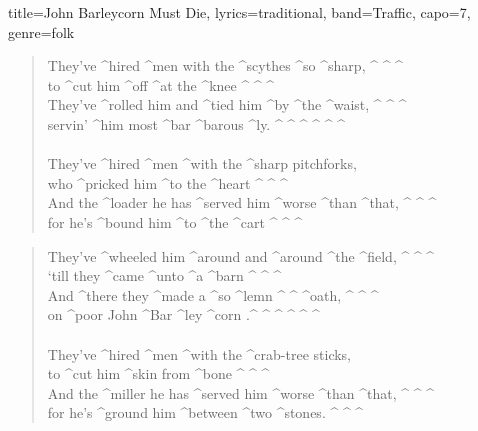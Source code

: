 \documentclass{article}
\def\RemoveSpaces#1{%
  \begingroup
  \spaceskip1sp
  \xspaceskip1sp
  #1%
  \endgroup}
\begin{document}
\begin{song}{title={John Barleycorn Must Die}, lyrics={traditional}, band={Traffic}, capo={7}, genre={folk}}
\begin{verse}
	\end{verse}
	\begin{chorus*}
		       
	\end{chorus*}
	\begin{verse}
		They've ^hired ^men with the ^scythes ^so ^sharp, ^ {} ^ {} ^ {} \\
		to ^cut him ^off ^at the ^knee ^ {} ^ {} ^ {} \\
		They've ^rolled him and ^tied him ^by ^the ^waist, ^ {} ^ {} ^ {} \\
		servin' ^him most \RemoveSpaces{^bar ^barous ^ly. }^ {} ^ {} ^ {}^ {} ^ {} ^ {} \\
		\\
		They've ^hired ^men ^with the ^sharp pitchforks, \\
		who ^pricked him ^to the ^heart ^ {} ^ {} ^ {} \\
		And the ^loader he has ^served him ^worse ^than ^that, ^ {} ^ {} ^ {} \\
		for he's ^bound him ^to ^the ^cart ^ {} ^ {} ^ {} \\
	\end{verse}
	\begin{chorus*}
		       \times 4
	\end{chorus*}
	\begin{verse}
		They've ^wheeled him ^around and ^around ^the ^field, ^ {} ^ {} ^ {} \\
		‘till they ^came ^unto ^a ^barn ^ {} ^ {} ^ {} \\
		And ^there they ^made a \RemoveSpaces{^so ^lemn }^ {}^ {}
		^oath, ^ {} ^ {} ^ {} \\
		on ^poor John \RemoveSpaces{^Bar ^ley ^corn }.^ {}^ {}^ {}
		^ {} ^ {} ^ {} \\
		\\
		They've ^hired ^men ^with the ^crab-tree sticks, \\
		to ^cut him ^skin from ^bone ^ {} ^ {} ^ {} \\
		And the ^miller he has ^served him ^worse ^than ^that, ^ {} ^ {} ^ {} \\
		for he's ^ground him ^between ^two ^stones. ^ {} ^ {} ^ {} \\

\end{verse}
\end{song}
\end{document}
